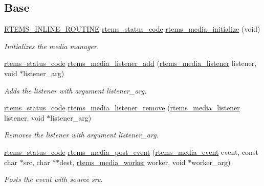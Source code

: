 \subsection*{Base}
\begin{DoxyCompactItemize}
\item 
\mbox{\hyperlink{group__RTEMSScoreBaseDefs_gac216239df231d5dbd15e3520b0b9313f}{R\+T\+E\+M\+S\+\_\+\+I\+N\+L\+I\+N\+E\+\_\+\+R\+O\+U\+T\+I\+NE}} \mbox{\hyperlink{group__ClassicStatus_ga545d41846817eaba6143d52ee4d9e9fe}{rtems\+\_\+status\+\_\+code}} \mbox{\hyperlink{group__RTEMSIOMedia_ga646cab27cb0119184f8831a28c02c603}{rtems\+\_\+media\+\_\+initialize}} (void)
\begin{DoxyCompactList}\small\item\em Initializes the media manager. \end{DoxyCompactList}\item 
\mbox{\hyperlink{group__ClassicStatus_ga545d41846817eaba6143d52ee4d9e9fe}{rtems\+\_\+status\+\_\+code}} \mbox{\hyperlink{group__RTEMSIOMedia_ga6f362dfc1a9ad18caeaca0debb68e9d9}{rtems\+\_\+media\+\_\+listener\+\_\+add}} (\mbox{\hyperlink{group__RTEMSIOMedia_ga8f3e1a300d58555b3c2921df90d2d637}{rtems\+\_\+media\+\_\+listener}} listener, void $\ast$listener\+\_\+arg)
\begin{DoxyCompactList}\small\item\em Adds the {\itshape listener} with argument {\itshape listener\+\_\+arg}. \end{DoxyCompactList}\item 
\mbox{\hyperlink{group__ClassicStatus_ga545d41846817eaba6143d52ee4d9e9fe}{rtems\+\_\+status\+\_\+code}} \mbox{\hyperlink{group__RTEMSIOMedia_ga8c5ea853c30d199131479e21a3db745b}{rtems\+\_\+media\+\_\+listener\+\_\+remove}} (\mbox{\hyperlink{group__RTEMSIOMedia_ga8f3e1a300d58555b3c2921df90d2d637}{rtems\+\_\+media\+\_\+listener}} listener, void $\ast$listener\+\_\+arg)
\begin{DoxyCompactList}\small\item\em Removes the {\itshape listener} with argument {\itshape listener\+\_\+arg}. \end{DoxyCompactList}\item 
\mbox{\hyperlink{group__ClassicStatus_ga545d41846817eaba6143d52ee4d9e9fe}{rtems\+\_\+status\+\_\+code}} \mbox{\hyperlink{group__RTEMSIOMedia_ga1904455ab5f9099298ff4d78fd60d3d4}{rtems\+\_\+media\+\_\+post\+\_\+event}} (\mbox{\hyperlink{group__RTEMSIOMedia_gadd58c5799ee997413d4d6be2ac05197b}{rtems\+\_\+media\+\_\+event}} event, const char $\ast$src, char $\ast$$\ast$dest, \mbox{\hyperlink{group__RTEMSIOMedia_ga4d3df16c316c9285e61bf0f735cafdd3}{rtems\+\_\+media\+\_\+worker}} worker, void $\ast$worker\+\_\+arg)
\begin{DoxyCompactList}\small\item\em Posts the {\itshape event} with source {\itshape src}. \end{DoxyCompactList}\end{DoxyCompactItemize}
